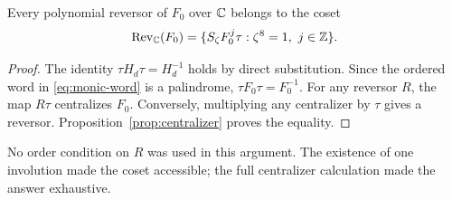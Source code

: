 \begin{corollary}\label{cor:geometric-reversors}
Every polynomial reversor of $F_0$ over $\mathbb C$ belongs to the coset
\begin{equation}\label{eq:monic-reversors}
  \operatorname{Rev}_{\mathbb C}(F_0)=
  \{S_\zeta F_0^j\tau:\zeta^8=1,\ j\in\mathbb Z\}.
\end{equation}
\end{corollary}

\begin{proof}
The identity $\tau H_d\tau=H_d^{-1}$ holds by direct
substitution. Since the ordered word in \eqref{eq:monic-word}
is a palindrome, $\tau F_0\tau=F_0^{-1}$.
For any reversor $R$, the map $R\tau$ centralizes $F_0$.
Conversely, multiplying any centralizer by $\tau$ gives a
reversor. Proposition~\ref{prop:centralizer} proves the equality.
\end{proof}

No order condition on $R$ was used in this argument. The existence
of one involution made the coset accessible; the full centralizer
calculation made the answer exhaustive.
